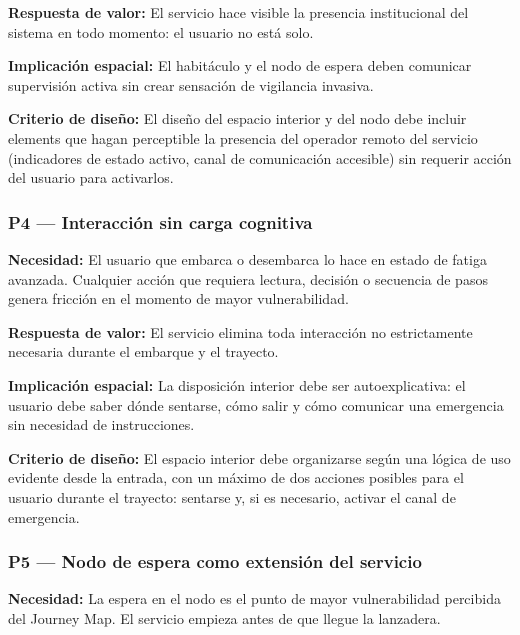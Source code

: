 \textbf{Respuesta de valor:} El servicio hace visible la presencia
institucional del sistema en todo momento: el usuario no está solo.

\textbf{Implicación espacial:} El habitáculo y el nodo de espera
deben comunicar supervisión activa sin crear sensación de
vigilancia invasiva.

\textbf{Criterio de diseño:} El diseño del espacio interior y del
nodo debe incluir elements que hagan perceptible la presencia del
operador remoto del servicio (indicadores de estado activo,
canal de comunicación accesible) sin requerir acción del usuario
para activarlos.


\subsubsection{P4 — Interacción sin carga cognitiva}
\label{sec:p4-cognitivo}

\textbf{Necesidad:} El usuario que embarca o desembarca lo hace
en estado de fatiga avanzada. Cualquier acción que requiera
lectura, decisión o secuencia de pasos genera fricción en el
momento de mayor vulnerabilidad.

\textbf{Respuesta de valor:} El servicio elimina toda interacción
no estrictamente necesaria durante el embarque y el trayecto.

\textbf{Implicación espacial:} La disposición interior debe ser
autoexplicativa: el usuario debe saber dónde sentarse, cómo
salir y cómo comunicar una emergencia sin necesidad de
instrucciones.

\textbf{Criterio de diseño:} El espacio interior debe organizarse
según una lógica de uso evidente desde la entrada, con un máximo
de dos acciones posibles para el usuario durante el trayecto:
sentarse y, si es necesario, activar el canal de emergencia.


\subsubsection{P5 — Nodo de espera como extensión del servicio}
\label{sec:p5-nodo}

\textbf{Necesidad:} La espera en el nodo es el punto de mayor
vulnerabilidad percibida del Journey Map. El servicio empieza
antes de que llegue la lanzadera.

